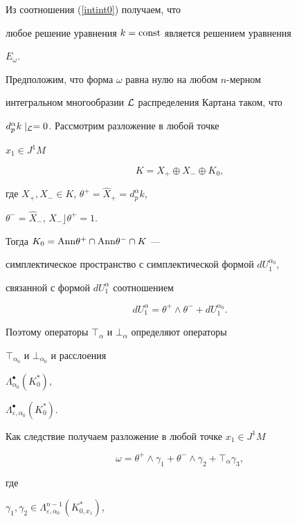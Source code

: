 \begin{pf}


Из соотношения (\ref{intint0}) получаем, что


любое решение уравнения $k={\operatorname{const}}$ является решением уравнения


$E_\omega$.





Предположим, что форма $\omega$ равна нулю на любом $n$-мерном


интегральном многообразии $\cal L$ распределения Картана таком, что 


$d_p^\alpha k\mid_{\cal L}=0$. Рассмотрим разложение в любой точке 


$x_1\in J^1M$


$$


K=X_{+}\oplus X_{-}\oplus K_0, 


$$


где $X_{+}, X_{-}\in K$, $\theta^{+}=\widehat{X}_{+}=d_p^\alpha k$, 


$\theta^{-}=\widehat{X}_{-}$, $X_{-}\rfloor \theta^{+}=1$.


Тогда $K_0={\operatorname{Ann}}\theta^{+}\cap {\operatorname{Ann}}\theta^{-}\cap K$ ---


симплектическое пространство с симплектической формой $dU_1^{\alpha_0}$,


связанной с формой $dU_1^{\alpha}$ соотношением


$$


dU_1^\alpha =\theta^{+}\wedge \theta^{-}+dU_1^{\alpha_0}. 


$$


Поэтому операторы $\top_\alpha $ и $\bot_\alpha $ определяют операторы 


$\top_{\alpha_0}$ и $\bot_{\alpha_0}$ и расслоения 


$\Lambda_{\alpha_0}^{\bullet }(K_0^{*})$,


$\Lambda_{\varepsilon ,\alpha_0}^{\bullet }(K_0^{*})$.


Как следствие получаем разложение в любой точке $x_1\in J^1M$


\begin{equation}


\omega=\theta^+\wedge\gamma_1+\theta^-\wedge\gamma_2+\top_\alpha


\gamma_3, \label{lepdecomp1}


\end{equation}


где


$\gamma_1,\gamma_2\in\Lambda_{\varepsilon,\alpha_0}^{n-1}(K_{0,x_1}^{*})$, 



\end{pf}

